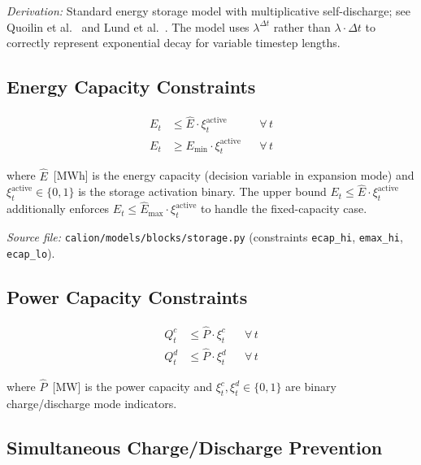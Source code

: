 \documentclass[a4paper,12pt]{article}
\begin{document}
\noindent\textit{Derivation:} Standard energy storage model with multiplicative
self-discharge; see Quoilin et al.~\cite{Quoilin2017} and Lund et al.~\cite{Lund2007}.
The model uses $\lambda^{\Delta t}$ rather than $\lambda \cdot \Delta t$ to correctly
represent exponential decay for variable timestep lengths.

\subsection{Energy Capacity Constraints}

\begin{align}
  E_{t} &\leq \hat{E} \cdot \xi^{\text{active}}_{t}    && \forall\, t \tag{ST-2} \label{eq:st2} \\
  E_{t} &\geq E_{\min} \cdot \xi^{\text{active}}_{t}   && \forall\, t \tag{ST-3} \label{eq:st3}
\end{align}

where $\hat{E}$~[MWh] is the energy capacity (decision variable in expansion mode) and
$\xi^{\text{active}}_{t} \in \{0,1\}$ is the storage activation binary.
The upper bound $E_t \leq \hat{E} \cdot \xi^{\text{active}}_t$ additionally enforces
$E_t \leq \hat{E}_{\max} \cdot \xi^{\text{active}}_t$ to handle the fixed-capacity case.

\noindent\textit{Source file:} \texttt{calion/models/blocks/storage.py} (constraints
\texttt{ecap\_hi}, \texttt{emax\_hi}, \texttt{ecap\_lo}).

\subsection{Power Capacity Constraints}

\begin{align}
  Q^{c}_{t} &\leq \hat{P} \cdot \xi^{c}_{t} && \forall\, t \tag{ST-4} \label{eq:st4} \\
  Q^{d}_{t} &\leq \hat{P} \cdot \xi^{d}_{t} && \forall\, t \tag{ST-5} \label{eq:st5}
\end{align}

where $\hat{P}$~[MW] is the power capacity and $\xi^{c}_{t}, \xi^{d}_{t} \in \{0,1\}$
are binary charge/discharge mode indicators.

\subsection{Simultaneous Charge/Discharge Prevention}
\end{document}
